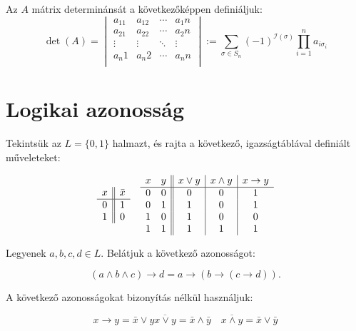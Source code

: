 \documentclass{article}
\begin{document}
Az $A$ mátrix determinánsát a következőképpen definiáljuk:
\begin{equation}
\operatorname{det}(A) =  \begin{vmatrix}
a_11 & a_12 & \cdots & a_1n \\
a_21 & a_22 & \cdots & a_2n \\
\vdots & \vdots & \ddots & \vdots \\
a_n1 & a_n2 & \cdots & a_nn \\
\end{vmatrix} := \sum_{\sigma \in S_n} (-1)^{\mathcal{I}(\sigma)} \prod_{i=1}^n a_{i\sigma_i}
\label{kettes}
\end{equation}

\section{Logikai azonosság}

Tekintsük az $L = \lbrace0, 1\rbrace$ halmazt, és rajta a következő, igazságtáblával definiált műveleteket:

\[\begin{array}{c || c}
x & \bar{x} \\ \hline
0 & 1 \\
1 & 0 \\
\end{array}
\quad
\begin{array}{c c || c | c | c}
x & y & x \vee y & x \wedge y & x \rightarrow y \\ \hline
0 & 0 & 0 & 0 & 1 \\
0 & 1 & 1 & 0 & 1 \\
1 & 0 & 1 & 0 & 0 \\
1 & 1 & 1 & 1 & 1 \\
\end{array}
\]

Legyenek $a, b, c, d \in L$. Belátjuk a következő azonosságot:

\begin{equation}
(a \wedge b \wedge c) \rightarrow d = a \rightarrow ( b \rightarrow( c \rightarrow d))\text{.}
\label{eq:harom}
\end{equation}

A következő azonosságokat bizonyítás nélkül használjuk:

\begin{subequations}
\begin{equation}
x \rightarrow y = \bar{x} \vee y
\label{eq:negyes_a}
\end{equation}
\begin{equation}
\overline{x \vee y} = \bar{x} \wedge \bar{y}
\quad
\overline{x \wedge y} = \bar{x} \vee \bar{y}
\label{eq:negyes_b}
\end{equation}
\label{eq:negyes}
\end{subequations}
\end{document}
